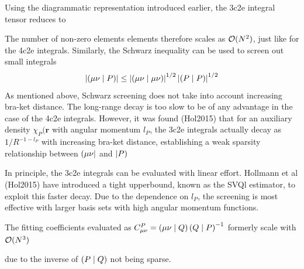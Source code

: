 Using the diagrammatic representation introduced earlier, the 3c2e integral tensor reduces to
\begin{center}
\end{center}
The number of non-zero elements elements therefore scales as $\mathcal{O}(N^{2})$, just like for the 4c2e integrals. Similarly, the Schwarz inequality can be used to screen out small integrals
\begin{equation}
\left\lvert \left( \mu\nu \mid P \right) \right\rvert \leq \left\lvert \left( \mu\nu \mid \mu\nu \right) \right\rvert^{1/2} \left\lvert \left( P \mid P \right) \right\rvert^{1/2}
\end{equation}
\noindent As mentioned above, Schwarz screening does not take into account increasing bra-ket distance. The long-range decay is too slow to be of any advantage in the case of the 4c2e integrals. However, it was found (Hol2015) that for an auxiliary density $\chi_P(\mathbf{r}$ with angular momentum $l_P$, the 3c2e integrals actually decay as $1/R^{-1 - l_P}$ with increasing bra-ket distance, establishing a weak sparsity relationship between $\left( \mu\nu \right\rvert$ and $\left\lvert P \right)$ 
\begin{center}
\end{center}
\noindent In principle, the 3c2e integrals can be evaluated with linear effort. Hollmann et al (Hol2015) have introduced a tight upperbound, known as the SVQl estimator, to exploit this faster decay. Due to the dependence on $l_P$, the screening is most effective with larger basis sets with high angular momentum functions.

The fitting coefficients evaluated as $C^P_{\mu\nu} = \left( \mu\nu \mid Q \right) \left( Q \mid P \right)^{-1}$ formerly scale with $\mathcal{O}(N^{3})$
\begin{center}
\end{center}
\noindent due to the inverse of $\left( P \mid Q \right)$ not being sparse. 

